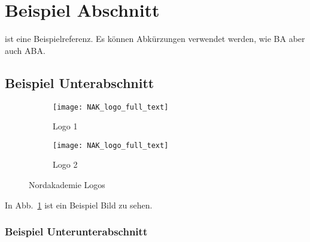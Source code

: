 \section{Beispiel Abschnitt}
\parencite{latex_companion} ist eine Beispielreferenz.
Es können Abkürzungen verwendet werden, wie \ac{BA} aber auch \ac{ABA}.

\subsection{Beispiel Unterabschnitt}

\begin{figure}[h]
    \centering

    \begin{subfigure}{.4\textwidth}
        \centering
        \texttt{[image: NAK\_logo\_full\_text]}
        \caption{Logo 1}
        \label{fig:subfig1}
    \end{subfigure}
    \begin{subfigure}{.4\textwidth}
        \centering
        \texttt{[image: NAK\_logo\_full\_text]}
        \caption{Logo 2}
        \label{fig:subfig2}
    \end{subfigure}

    \caption{Nordakademie Logos}
    \label{fig:fig}
\end{figure}

In Abb.\ \ref{fig:subfig1} ist ein Beispiel Bild zu sehen.

\subsubsection{Beispiel Unterunterabschnitt}

\Blindtext{}
